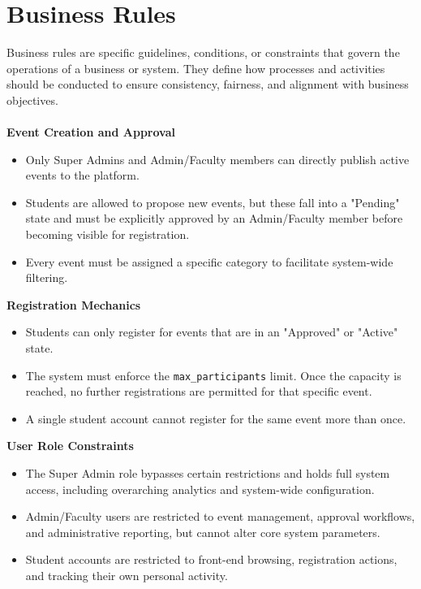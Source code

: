 \section{Business Rules}
Business rules are specific guidelines, conditions, or constraints that govern the operations of a business or system. They define how processes and activities should be conducted to ensure consistency, fairness, and alignment with business objectives.\\\\
\textbf{Event Creation and Approval}
\begin{itemize}
    \item Only Super Admins and Admin/Faculty members can directly publish active events to the platform.
    \item Students are allowed to propose new events, but these fall into a "Pending" state and must be explicitly approved by an Admin/Faculty member before becoming visible for registration.
    \item Every event must be assigned a specific category to facilitate system-wide filtering.
\end{itemize}
\textbf{Registration Mechanics}
\begin{itemize}
    \item Students can only register for events that are in an "Approved" or "Active" state.
    \item The system must enforce the \texttt{max\_participants} limit. Once the capacity is reached, no further registrations are permitted for that specific event.
    \item A single student account cannot register for the same event more than once.
\end{itemize}
\textbf{User Role Constraints}
\begin{itemize}
    \item The Super Admin role bypasses certain restrictions and holds full system access, including overarching analytics and system-wide configuration.
    \item Admin/Faculty users are restricted to event management, approval workflows, and administrative reporting, but cannot alter core system parameters.
    \item Student accounts are restricted to front-end browsing, registration actions, and tracking their own personal activity.
\end{itemize}

\newpage
